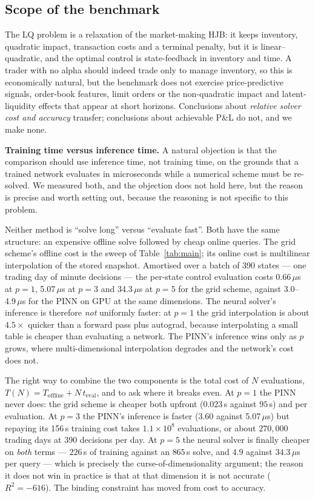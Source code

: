 \documentclass[conference]{IEEEtran}
\begin{document}
\subsection{Scope of the benchmark}
The LQ problem is a relaxation of the market-making HJB: it
keeps inventory, quadratic impact, transaction costs and a terminal penalty, but it is
linear--quadratic, and the optimal control is state-feedback in inventory and time. A trader
with no alpha should indeed trade only to manage inventory, so this is economically natural,
but the benchmark does not exercise price-predictive signals, order-book features, limit
orders or the non-quadratic impact and latent-liquidity effects that appear at short
horizons. Conclusions about \emph{relative solver cost and accuracy} transfer; conclusions
about achievable P\&L do not, and we make none.

\textbf{Training time versus inference time.} A natural objection is that the comparison should
use inference time, not training time, on the grounds that a trained network evaluates in
microseconds while a numerical scheme must be re-solved. We measured both, and the objection
does not hold here, but the reason is precise and worth setting out, because the reasoning is not
specific to this problem.

Neither method is ``solve long'' versus ``evaluate fast''. Both have the same structure:
an expensive offline solve followed by cheap online queries. The grid scheme's offline cost is
the sweep of Table~\ref{tab:main}; its online cost is multilinear interpolation of the stored
snapshot. Amortised over a batch of 390 states --- one trading day of minute decisions --- the
per-state control evaluation costs 0.66\,$\mu$s at $p=1$, 5.07\,$\mu$s at $p=3$ and
34.3\,$\mu$s at $p=5$ for the grid scheme, against 3.0--4.9\,$\mu$s for the PINN on GPU at the
same dimensions. The neural solver's inference is therefore \emph{not} uniformly faster: at $p=1$ the
grid interpolation is about $4.5\times$ quicker than a forward pass plus autograd, because
interpolating a small table is cheaper than evaluating a network. The PINN's inference wins only
as $p$ grows, where multi-dimensional interpolation degrades and the network's cost does not.

The right way to combine the two components is the total cost of $N$ evaluations,
$T(N) = T_{\text{offline}} + N\,t_{\text{eval}}$, and to ask where it breaks even. At $p=1$ the
PINN never does: the grid scheme is cheaper both upfront ($0.023$\,s against $95$\,s) and per
evaluation. At $p=3$ the PINN's inference is faster (3.60 against 5.07\,$\mu$s) but repaying its
156\,s training cost takes $1.1\times10^{8}$ evaluations, or about $270{,}000$ trading days at
390 decisions per day. At $p=5$ the neural solver is finally cheaper on \emph{both} terms ---
$226$\,s of training against an $865$\,s solve, and $4.9$ against $34.3$\,$\mu$s per query ---
which is precisely the curse-of-dimensionality argument; the reason it does not win in practice
is that at that dimension it is not accurate ($R^2 = -616$). The binding constraint has moved
from cost to accuracy.
\end{document}
